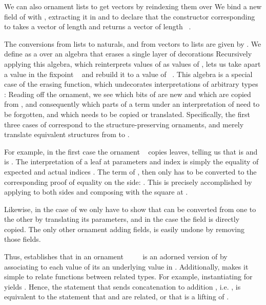 We can also ornament lists to get vectors by reindexing them over \bN{}
We bind a new field of \bN{} with , extracting it in  and  to declare that the constructor corresponding to  takes a vector of length  and returns a vector of length \ . 

The conversions from lists to naturals, and from vectors to lists are given by . We define  as a  over an algebra that erases a single layer of decorations
Recursively applying this algebra, which reinterprets values of  as values of , lets us take apart a value in the fixpoint \  and rebuild it to a value of \ . This algebra
is a special case of the erasing function, which undecorates interpretations of arbitrary types :
Reading off the ornament, we see which bits of  are new and which are copied from , and consequently which parts of a term  under an interpretation of  need to be forgotten, and which needs to be copied or translated. Specifically, the first three cases of  correspond to the structure-preserving ornaments, and merely translate equivalent structures from  to .

For example, in the first case the ornament \  copies leaves, telling us that  is  and  is . The interpretation  of a leaf  at parameters  and index  is simply the equality of expected and actual indices . The term  of , then only has to be converted to the corresponding proof of equality on the  side: . This is precisely accomplished by applying  to both sides and composing with the square  at .

Likewise, in the case of  we only have to show that  can be converted from one  to the other  by translating its parameters, and in the  case the field is directly copied. The only other ornament  adding fields, is easily undone by removing those fields. 

Thus,  establishes that  in an ornament \ \ \ \  is an adorned version of  by associating to each value of  its an underlying value in . Additionally,  makes it simple to relate functions between related types. For example, instantiating  for  yields . Hence, the statement that  sends concatenation \AF{\_++\_} to addition \AF{\_+\_}, i.e. , is equivalent to the statement that \AF{\_++\_} and \AF{\_+\_} are related, or that \AF{\_++\_} is a lifting of \AF{\_+\_} \cite{orntrans}. 

